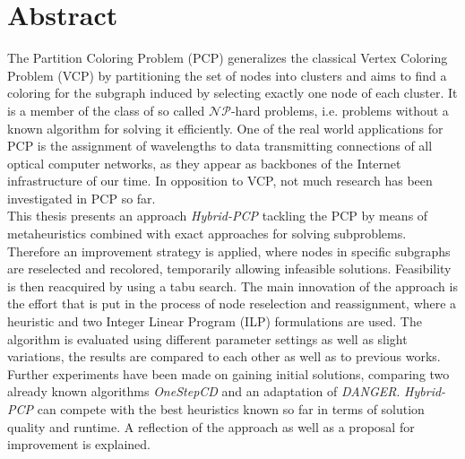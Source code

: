 \chapter*{Abstract}

The Partition Coloring Problem (PCP) generalizes the classical Vertex Coloring Problem (VCP) by partitioning the set of nodes into clusters and aims to find a coloring for the subgraph induced by selecting exactly one node of each cluster. It is a member of the class of so called $\mathcal{NP}$-hard problems, i.e. problems without a known algorithm for solving it efficiently. One of the real world applications for PCP is the assignment of wavelengths to data transmitting connections of all optical computer networks, as they appear as backbones of the Internet infrastructure of our time. In opposition to VCP, not much research has been investigated in PCP so far.\\

This thesis presents an approach \textit{Hybrid-PCP} tackling the PCP by means of metaheuristics combined with exact approaches for solving subproblems. Therefore an improvement strategy is applied, where nodes in specific subgraphs are reselected and recolored, temporarily allowing infeasible solutions. Feasibility is then reacquired by using a tabu search. The main innovation of the approach is the effort that is put in the process of node reselection and reassignment, where a heuristic and two  Integer Linear Program (ILP) formulations are used. The algorithm is evaluated using different parameter settings as well as slight variations, the results are compared to each other as well as to previous works. Further experiments have been made on gaining initial solutions, comparing two already known algorithms \textit{OneStepCD} and an adaptation of \textit{DANGER}. \textit{Hybrid-PCP} can compete with the best heuristics known so far in terms of solution quality and runtime. A reflection of the approach as well as a proposal for improvement is explained.

